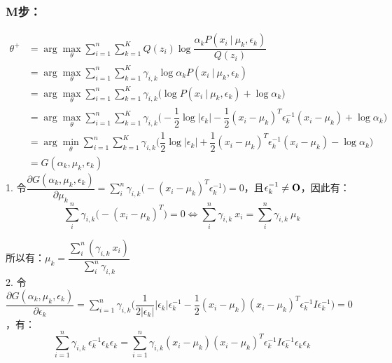 \documentclass[12pt,a4paper]{article}
\begin{document}
\begin{spacing}{1.3}
\subsubsection*{M步：}
\begin{equation}
    \begin{split}
        \theta^{+} 
        &=\arg\max\limits_{\theta}  \sum\limits_{i=1}^{n} \sum\limits_{k=1}^{K} Q(z_{i})\log \dfrac{\alpha_{k} P(x_{i} \ | \ \mu_{k}, \epsilon_{k})}{Q(z_{i})} \\
        &=\arg\max\limits_{\theta}  \sum\limits_{i=1}^{n} \sum\limits_{k=1}^{K} \gamma_{i,k} \log \alpha_{k} P(x_{i} \ | \ \mu_{k}, \epsilon_{k}) \\
        &=\arg\max\limits_{\theta}  \sum\limits_{i=1}^{n} \sum\limits_{k=1}^{K} \gamma_{i,k} \biggl(\log P(x_{i} \ | \ \mu_{k}, \epsilon_{k}) + \log \alpha_{k} \biggr)
        \\ &=\arg\max\limits_{\theta}  \sum\limits_{i=1}^{n} \sum\limits_{k=1}^{K} \gamma_{i,k} \biggl( -\dfrac{1}{2}\log |\epsilon_{k}|-\dfrac{1}{2} (x_{i}-\mu_{k})^{T}\epsilon_{k}^{-1}(x_{i}-\mu_{k}) + \log \alpha_{k}       \biggr)
        \\ &=\arg\min\limits_{\theta}  \sum\limits_{i=1}^{n} \sum\limits_{k=1}^{K} \gamma_{i,k} \biggl( \dfrac{1}{2}\log |\epsilon_{k}|+\dfrac{1}{2} (x_{i}-\mu_{k})^{T}\epsilon_{k}^{-1}(x_{i}-\mu_{k}) - \log \alpha_{k}       \biggr)
        \\ &=G(\alpha_{k},\mu_{k},\epsilon_{k})
        \nonumber
    \end{split}
\end{equation}
1. 令$  \dfrac{\partial G(\alpha_{k},\mu_{k},\epsilon_{k})}{\partial \mu_{k}} 
=\sum\limits_{i}^{n} \gamma_{i,k} \biggl( -(x_{i}-\mu_{k})^{T}\epsilon_{k}^{-1} \biggr) = 0   $，且$\epsilon_{k}^{-1} \not = \bf{O}$，因此有：
$$\sum\limits_{i}^{n} \gamma_{i,k} \biggl( -(x_{i}-\mu_{k})^{T} \biggr) = 0  \Longleftrightarrow 
\sum\limits_{i}^{n} \gamma_{i,k}\ x_{i} = \sum\limits_{i}^{n} \gamma_{i,k}\ \mu_{k}$$
\par 所以有：$\mu_{k} = \dfrac{\sum\limits_{i}^{n} (\gamma_{i,k}\ x_{i})}{\sum\limits_{i}^{n} \gamma_{i,k}} $ 
\\2. 令$  \dfrac{\partial G(\alpha_{k},\mu_{k},\epsilon_{k})}{\partial \epsilon_{k}} 
=\sum\limits_{i=1}^{n} \gamma_{i,k} \biggl( \dfrac{1}{2|\epsilon_{k}|}|\epsilon_{k}|\epsilon_{k}^{-1} - \dfrac{1}{2}(x_{i}-\mu_{k})(x_{i}-\mu_{k})^{T}\epsilon_{k}^{-1}I\epsilon_{k}^{-1} \biggr) = 0 $，有：
$$\sum\limits_{i=1}^{n} \gamma_{i,k}\ \epsilon_{k}^{-1}\epsilon_{k}\epsilon_{k} = \sum\limits_{i=1}^{n} \gamma_{i,k} (x_{i}-\mu_{k})(x_{i}-\mu_{k})^{T}\epsilon_{k}^{-1}I\epsilon_{k}^{-1}\epsilon_{k}\epsilon_{k} $$

\end{spacing}
\end{document}

